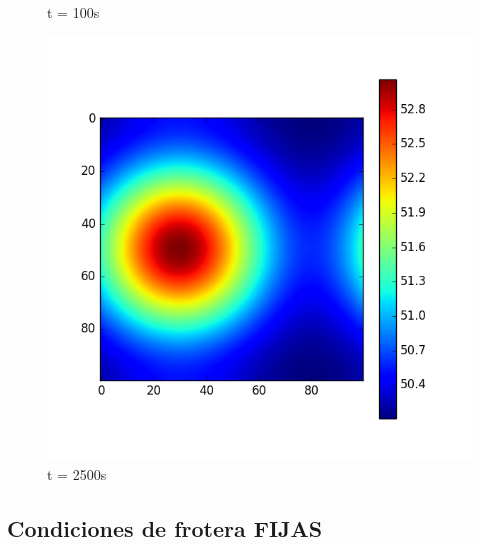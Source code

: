 \documentclass{article}
\begin{document}
\begin{figure}[H]
  \caption{t = 100s}\label{fig:awesome_image2}
\endminipage\hfill
{}%
  \includegraphics[width=\linewidth]{periodicasNOCte2500.png}
  \caption{t = 2500s}\label{fig:awesome_image3}
\endminipage
\end{figure}


\subsection{Condiciones de frotera FIJAS}
\end{document}
